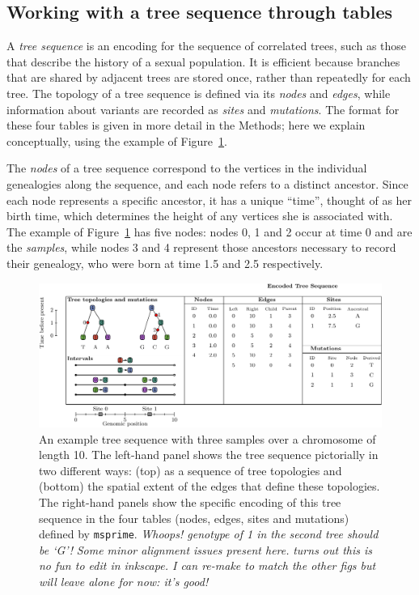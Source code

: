 \documentclass{article}
\newcommand{\msprime}{\texttt{msprime}}
\newcommand{\plr}[1]{{\em \color{blue} #1}}
\newcommand{\jk}[1]{{\em \color{red} #1}}
\begin{document}
\subsection*{Working with a tree sequence through tables}

A \emph{tree sequence} is an encoding for the sequence of correlated trees,
such as those that describe the history of a sexual population.
It is efficient because branches that are shared by adjacent trees are stored once,
rather than repeatedly for each tree.
The topology of a tree sequence is defined via its \emph{nodes} and \emph{edges},
while information about variants are recorded as \emph{sites} and \emph{mutations}.
The format for these four tables is given in more detail in the Methods;
here we explain conceptually,
using the example of Figure~\ref{fig:example_tree_sequence}.

The \emph{nodes} of a tree sequence
correspond to the vertices in the individual genealogies along the sequence,
and each node refers to a distinct ancestor.
Since each node represents a specific ancestor, it has a unique ``time'',
thought of as her birth time, which determines the height of any vertices
she is associated with.
The example of Figure~\ref{fig:example_tree_sequence} has five nodes:
nodes 0, 1 and 2 occur at time 0 and are the \emph{samples},
while nodes 3 and 4 represent those ancestors necessary to record their genealogy,
who were born at time 1.5 and 2.5 respectively.

\begin{figure}
    \begin{center}
        \includegraphics[width=\textwidth]{example_tree_sequence}
    \end{center}
    \caption{
        An example tree sequence with three samples over a chromosome of length 10.
        The left-hand panel shows the tree sequence pictorially in two different ways:
        (top) as a sequence of tree topologies
        and (bottom) the spatial extent of the edges that define these topologies.
        The right-hand panels show the specific encoding
        of this tree sequence in the four tables (nodes, edges, sites and mutations)
        defined by \msprime.
        \plr{Whoops!  genotype of 1 in the second tree should be `G'!}
        \jk{Some minor alignment issues present here.}
        \plr{turns out this is no fun to edit in inkscape.
            I can re-make to match the other figs
            but will leave alone for now: it's good!}
        \label{fig:example_tree_sequence}
    }
\end{figure}
\end{document}
